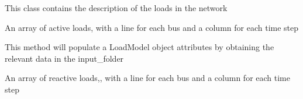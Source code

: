 \documentclass[letterpaper,10pt,english]{sphinxmanual}
\begin{document}

\begin{fulllineitems}
\label{ropf:ropf.Simulation.LoadModel}
This class contains the description of the loads in the network

\begin{fulllineitems}
\label{ropf:ropf.Simulation.LoadModel.activeload}
An array of active loads, with a line for each bus and a column for each time step

\end{fulllineitems}


\begin{fulllineitems}
\label{ropf:ropf.Simulation.LoadModel.init_loadmodel}
This method will populate a LoadModel object attributes by obtaining the
relevant data in the input\_folder

\end{fulllineitems}


\begin{fulllineitems}
\label{ropf:ropf.Simulation.LoadModel.reactiveload}
An array of reactive loads,, with a line for each bus and a column for each time step

\end{fulllineitems}


\end{fulllineitems}

\end{document}
